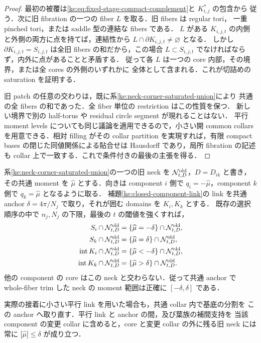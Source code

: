 \begin{proof}
最初の被覆は\eqref{ke:eq:fixed-stage-compact-complement}と $K^*_{i,j}$ の包含から
従う．次に旧 fibration の一つの fiber $L$ を取る．旧 fibers は regular tori，
一重 pinched tori，または saddle 型の連結な fibers である．
$L$ がある $K_{i,j,t}$ の内側と外側の両方に点を持てば，連結性から
$L\cap\partial K_{i,j,t}\ne\varnothing$ となる．
しかし $\partial K_{i,j,t}=S_{i,j,t}$ は全旧 fibers の和だから，この場合
$L\subset S_{i,j,t}$ でなければならず，内外に点があることと矛盾する．
従って各 $L$ は一つの core 内部，その境界，または全 cores の外側のいずれかに
全体として含まれる．これが切詰めの saturation を証明する．

旧 patch の任意の交わりは，既に系\ref{ke:neck-corner-saturated-union}により
共通の全 fibers の和であった．全 fiber 単位の restriction はこの性質を保つ．
新しい境界で別の half-torus や residual circle segment が現れることはない．
平行 moment levels についても同じ議論を適用できるので，小さい開 common collars
を用意できる．相対 filling がその collar partition を実現すれば，有限 compact
bases の閉じた同値関係による貼合せは Hausdorff であり，局所 fibration の記述も
collar 上で一致する．これで条件付きの最後の主張を得る．
\end{proof}

\begin{lemma}
\label{ke:anchor-trimmed-neck-domain}
系\ref{ke:neck-corner-saturated-union}の一つの旧 neck を
$\mathcal N^{\rm old}_{t,D}$，$D=D_{ik}$ と書き，その共通 moment を
$\widehat\mu$ とする．向きは component $i$ 側で
$q_i=-\widehat\mu$，component $k$ 側で
$q_k=\widehat\mu$ となるように取る．
補題\ref{ke:closed-component-link}の link を共通 anchor
$\delta=4\pi/N_j$ で取り，それが囲む domains を $K_i,K_k$ とする．
既存の選択順序の中で $n_j,N_j$ の下限，最後の $t$ の閾値を強くすれば，
\begin{align*}
 S_i\cap\mathcal N^{\rm old}_{t,D}
   &=\{\widehat\mu=-\delta\}\cap\mathcal N^{\rm old}_{t,D},\\
 S_k\cap\mathcal N^{\rm old}_{t,D}
   &=\{\widehat\mu=\delta\}\cap\mathcal N^{\rm old}_{t,D},\\
 \operatorname{int}K_i\cap\mathcal N^{\rm old}_{t,D}
   &=\{\widehat\mu<-\delta\}\cap\mathcal N^{\rm old}_{t,D},\\
 \operatorname{int}K_k\cap\mathcal N^{\rm old}_{t,D}
   &=\{\widehat\mu>\delta\}\cap\mathcal N^{\rm old}_{t,D}.
\end{align*}
他の component の core はこの neck と交わらない．従って共通 anchor で
whole-fiber trim した neck の moment 範囲は正確に $[-\delta,\delta]$ である．

実際の接着に小さい平行 link を用いた場合も，共通 collar 内で基底の分割を
この anchor へ取り直す．平行 link と anchor の間，及び葉族の補間支持を
当該 component の変更 collar に含めると，core と変更 collar の外に残る旧 neck
には常に $|\widehat\mu|\le\delta$ が成り立つ．
\end{lemma}

